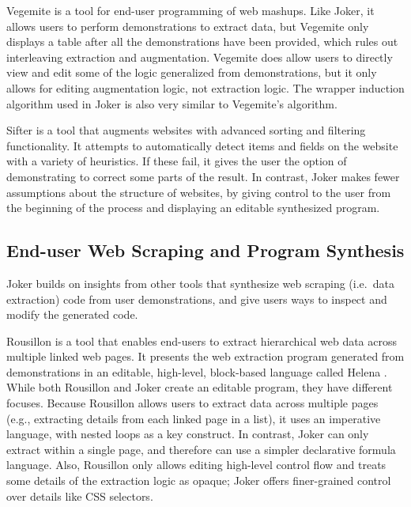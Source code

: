 \documentclass[sigconf,10pt]{acmart}
\begin{document}
Vegemite \citep{lin2009} is a tool for end-user programming of web
mashups. Like Joker, it allows users to perform demonstrations to
extract data, but Vegemite only displays a table after all the
demonstrations have been provided, which rules out interleaving
extraction and augmentation. Vegemite does allow users to directly view
and edit some of the logic generalized from demonstrations, but it only
allows for editing augmentation logic, not extraction logic. The wrapper
induction algorithm used in Joker is also very similar to Vegemite's
algorithm.

Sifter \citep{huynh2006} is a tool that augments websites with advanced
sorting and filtering functionality. It attempts to automatically detect
items and fields on the website with a variety of heuristics. If these
fail, it gives the user the option of demonstrating to correct some
parts of the result. In contrast, Joker makes fewer assumptions about
the structure of websites, by giving control to the user from the
beginning of the process and displaying an editable synthesized program.

\hypertarget{end-user-web-scraping-and-program-synthesis}{%
\subsection{End-user Web Scraping and Program
Synthesis}\label{end-user-web-scraping-and-program-synthesis}}

Joker builds on insights from other tools that synthesize web scraping
(i.e.~data extraction) code from user demonstrations, and give users
ways to inspect and modify the generated code.

Rousillon \citep{chasins2018} is a tool that enables end-users to
extract hierarchical web data across multiple linked web pages. It
presents the web extraction program generated from demonstrations in an
editable, high-level, block-based language called Helena \citep{2021c}.
While both Rousillon and Joker create an editable program, they have
different focuses. Because Rousillon allows users to extract data across
multiple pages (e.g., extracting details from each linked page in a
list), it uses an imperative language, with nested loops as a key
construct. In contrast, Joker can only extract within a single page, and
therefore can use a simpler declarative formula language. Also,
Rousillon only allows editing high-level control flow and treats some
details of the extraction logic as opaque; Joker offers finer-grained
control over details like CSS selectors.
\end{document}
